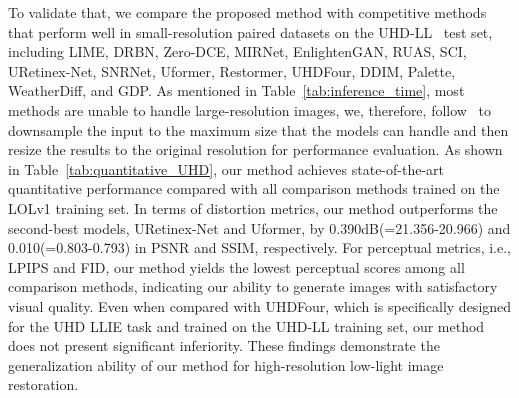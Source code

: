 To validate that, we compare the proposed method with competitive methods that perform well in small-resolution paired datasets on the UHD-LL~\cite{UHD_ICLR} test set, including LIME, DRBN, Zero-DCE, MIRNet, EnlightenGAN, RUAS, SCI, URetinex-Net, SNRNet, Uformer, Restormer, UHDFour, DDIM, Palette, WeatherDiff, and GDP. As mentioned in Table~\ref{tab:inference_time}, most methods are unable to handle large-resolution images, we, therefore, follow~\cite{UHD_ICLR} to downsample the input to the maximum size that the models can handle and then resize the results to the original resolution for performance evaluation. As shown in Table~\ref{tab:quantitative_UHD}, our method achieves state-of-the-art quantitative performance compared with all comparison methods trained on the LOLv1 training set. In terms of distortion metrics, our method outperforms the second-best models, URetinex-Net and Uformer, by 0.390dB(=21.356-20.966) and 0.010(=0.803-0.793) in PSNR and SSIM, respectively. For perceptual metrics, i.e., LPIPS and FID, our method yields the lowest perceptual scores among all comparison methods, indicating our ability to generate images with satisfactory visual quality. Even when compared with UHDFour, which is specifically designed for the UHD LLIE task and trained on the UHD-LL training set, our method does not present significant inferiority. These findings demonstrate the generalization ability of our method for high-resolution low-light image restoration.

